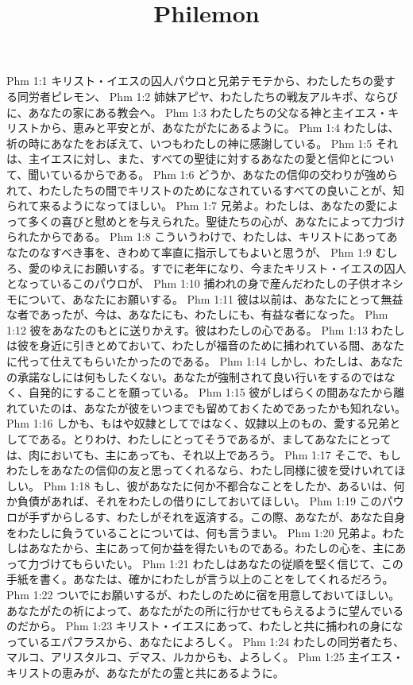 

\title{Philemon}

Phm 1:1  キリスト・イエスの囚人パウロと兄弟テモテから、わたしたちの愛する同労者ピレモン、
Phm 1:2  姉妹アピヤ、わたしたちの戦友アルキポ、ならびに、あなたの家にある教会へ。
Phm 1:3  わたしたちの父なる神と主イエス・キリストから、恵みと平安とが、あなたがたにあるように。
Phm 1:4  わたしは、祈の時にあなたをおぼえて、いつもわたしの神に感謝している。
Phm 1:5  それは、主イエスに対し、また、すべての聖徒に対するあなたの愛と信仰とについて、聞いているからである。
Phm 1:6  どうか、あなたの信仰の交わりが強められて、わたしたちの間でキリストのためになされているすべての良いことが、知られて来るようになってほしい。
Phm 1:7  兄弟よ。わたしは、あなたの愛によって多くの喜びと慰めとを与えられた。聖徒たちの心が、あなたによって力づけられたからである。
Phm 1:8  こういうわけで、わたしは、キリストにあってあなたのなすべき事を、きわめて率直に指示してもよいと思うが、
Phm 1:9  むしろ、愛のゆえにお願いする。すでに老年になり、今またキリスト・イエスの囚人となっているこのパウロが、
Phm 1:10  捕われの身で産んだわたしの子供オネシモについて、あなたにお願いする。
Phm 1:11  彼は以前は、あなたにとって無益な者であったが、今は、あなたにも、わたしにも、有益な者になった。
Phm 1:12  彼をあなたのもとに送りかえす。彼はわたしの心である。
Phm 1:13  わたしは彼を身近に引きとめておいて、わたしが福音のために捕われている間、あなたに代って仕えてもらいたかったのである。
Phm 1:14  しかし、わたしは、あなたの承諾なしには何もしたくない。あなたが強制されて良い行いをするのではなく、自発的にすることを願っている。
Phm 1:15  彼がしばらくの間あなたから離れていたのは、あなたが彼をいつまでも留めておくためであったかも知れない。
Phm 1:16  しかも、もはや奴隷としてではなく、奴隷以上のもの、愛する兄弟としてである。とりわけ、わたしにとってそうであるが、ましてあなたにとっては、肉においても、主にあっても、それ以上であろう。
Phm 1:17  そこで、もしわたしをあなたの信仰の友と思ってくれるなら、わたし同様に彼を受けいれてほしい。
Phm 1:18  もし、彼があなたに何か不都合なことをしたか、あるいは、何か負債があれば、それをわたしの借りにしておいてほしい。
Phm 1:19  このパウロが手ずからしるす、わたしがそれを返済する。この際、あなたが、あなた自身をわたしに負うていることについては、何も言うまい。
Phm 1:20  兄弟よ。わたしはあなたから、主にあって何か益を得たいものである。わたしの心を、主にあって力づけてもらいたい。
Phm 1:21  わたしはあなたの従順を堅く信じて、この手紙を書く。あなたは、確かにわたしが言う以上のことをしてくれるだろう。
Phm 1:22  ついでにお願いするが、わたしのために宿を用意しておいてほしい。あなたがたの祈によって、あなたがたの所に行かせてもらえるように望んでいるのだから。
Phm 1:23  キリスト・イエスにあって、わたしと共に捕われの身になっているエパフラスから、あなたによろしく。
Phm 1:24  わたしの同労者たち、マルコ、アリスタルコ、デマス、ルカからも、よろしく。
Phm 1:25  主イエス・キリストの恵みが、あなたがたの霊と共にあるように。


